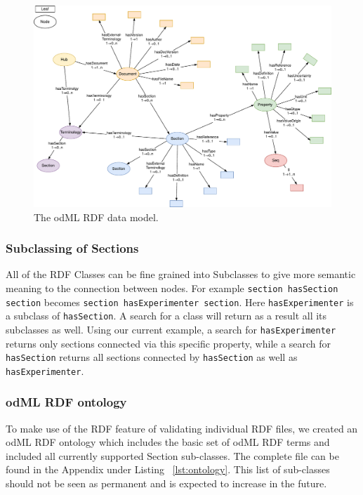 \documentclass{article}
\begin{document}
\begin{figure}
\begin{center}
\includegraphics[width=0.90\columnwidth]{figures/odmlRDFDataModel.pdf}
\caption{The odML RDF data model.}
\label{fig:rdfModel}
\end{center}
\end{figure}

\subsubsection{Subclassing of Sections} \label{sec:rdf_subclassing}
All of the RDF Classes can be fine grained into Subclasses to give more semantic meaning to the connection between nodes. For example \texttt{section hasSection section} becomes \texttt{section hasExperimenter section}. Here \texttt{hasExperimenter} is a subclass of \texttt{hasSection}. A search for a class will return as a result all its subclasses as well. Using our current example, a search for \texttt{hasExperimenter} returns only sections connected via this specific property, while a search for \texttt{hasSection} returns all sections connected by \texttt{hasSection} as well as \texttt{hasExperimenter}.

\subsubsection{odML RDF ontology} \label{sec:odml_ontology}
To make use of the RDF feature of validating individual RDF files, we created an odML RDF ontology which includes the basic set of odML RDF terms and included all currently supported Section sub-classes. The complete file can be found in the Appendix under Listing ~\ref{lst:ontology}. This list of sub-classes should not be seen as permanent and is expected to increase in the future.
\end{document}

